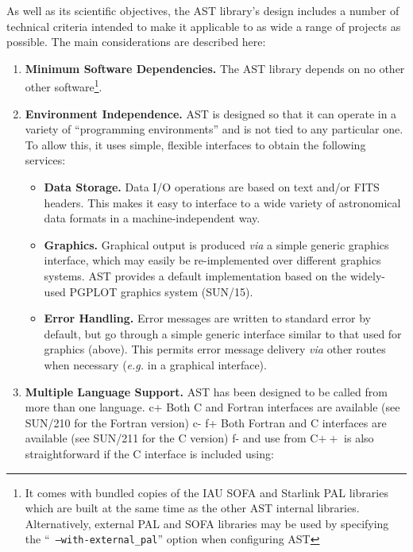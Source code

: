\documentclass[twoside,11pt]{article}
\newcommand{\xref}[3]{#1}
\begin{document}
As well as its scientific objectives, the AST library's design
includes a number of technical criteria intended to make it applicable
to as wide a range of projects as possible. The main considerations
are described here:

\begin{enumerate}
\item {\bf{Minimum Software Dependencies.}}
The AST library depends on no other other software\footnote{It comes with
bundled copies of the IAU SOFA and Starlink PAL libraries which are built
at the same time as the other AST internal libraries. Alternatively, external
PAL and SOFA libraries may be used by specifying the ``{\tt
--with-external\_pal}'' option when configuring AST}.

\item {\bf{Environment Independence.}}
AST is designed so that it can operate in a variety of ``programming
environments'' and is not tied to any particular one. To allow this,
it uses simple, flexible interfaces to obtain the following services:

\begin{itemize}
\item {\bf{Data Storage.}} Data I/O operations are based on text
and/or FITS headers. This makes it easy to interface to a wide variety
of astronomical data formats in a machine-independent way.

\item {\bf{Graphics.}} Graphical output is produced {\em{via}} a
simple generic graphics interface, which may easily be re-implemented
over different graphics systems. AST provides a default implementation
based on the widely-used PGPLOT graphics system
(\xref{SUN/15}{sun15}{}).

\item {\bf{Error Handling.}} Error messages are written to standard
error by default, but go through a simple generic interface similar to
that used for graphics (above). This permits error message delivery
{\em{via}} other routes when necessary ({\em{e.g.}} in a graphical
interface).
\end{itemize}

\item {\bf{Multiple Language Support.}}
AST has been designed to be called from more than one language.
c+
Both C and Fortran interfaces are available (see
\xref{SUN/210}{sun210}{} for the Fortran version)
c-
f+
Both Fortran and C interfaces are available (see
\xref{SUN/211}{sun211}{} for the C version)
f-
and use from C$++$ is also straightforward if the C interface is
included using:


\end{enumerate}
\end{document}
